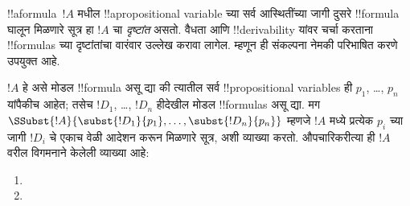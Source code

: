 \documentclass[../../../include/open-logic-section]{subfiles}
\begin{document}


!!a{formula}~$!A$ मधील !!a{propositional variable} च्या सर्व
आस्थितींच्या जागी दुसरे !!{formula} घालून मिळणारे सूत्र हा
$!A$ चा \emph{दृष्टांत} असतो. वैधता आणि !!{derivability}
यांवर चर्चा करताना !!{formula}s च्या दृष्टांतांचा वारंवार
उल्लेख करावा लागेल. म्हणून ही संकल्पना नेमकी परिभाषित
करणे उपयुक्त आहे.

\begin{defn}
  $!A$ हे असे मोडल !!{formula} असू द्या की त्यातील सर्व
  !!{propositional
    variable}s ही $p_1$, \dots, $p_n$ यांपैकीच
  आहेत; तसेच $!D_1$, \dots, $!D_n$ हीदेखील मोडल !!{formula}s
  असू द्या. मग
  $\SSubst{!A}{\subst{!D_1}{p_1}, \dots, \subst{!D_n}{p_n}}$
  म्हणजे $!A$ मध्ये प्रत्येक $p_i$ च्या जागी $!D_i$ चे
  एकाच वेळी आदेशन करून मिळणारे सूत्र, अशी व्याख्या करतो.
  औपचारिकरीत्या ही $!A$ वरील विगमनाने केलेली व्याख्या आहे:
  \begin{enumerate}
    \item {}
    \item {}
\end{enumerate}
\end{defn}
\end{document}
